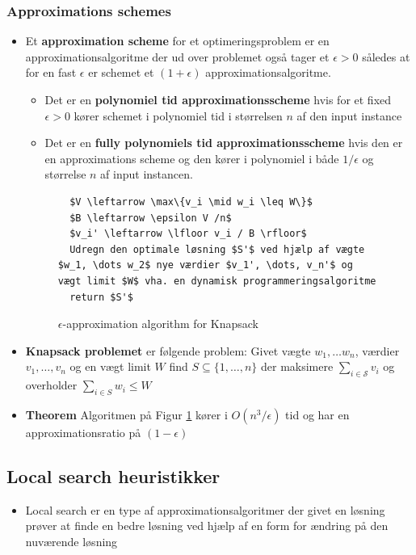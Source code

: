 \subsubsection{Approximations schemes}
\begin{itemize}
	\item Et \textbf{approximation scheme} for et optimeringsproblem er en approximationsalgoritme der ud over problemet også tager et $\epsilon >0$ således at for en fast $\epsilon$ er schemet et $(1+\epsilon)$ approximationsalgoritme. 
  \begin{itemize}
		\item Det er en \textbf{polynomiel tid approximationsscheme} hvis for et fixed $\epsilon >0$ kører schemet i polynomiel tid i størrelsen $n$ af den input instance
    \item Det er en \textbf{fully polynomiels tid approximationsscheme} hvis den er en approximations scheme og den kører i polynomiel i både $1/ \epsilon$ og størrelse $n$ af input instancen.
  \end{itemize}
  \begin{figure}[ht]
    \centering
\begin{lstlisting} 
  $V \leftarrow \max\{v_i \mid w_i \leq W\}$
  $B \leftarrow \epsilon V /n$
  $v_i' \leftarrow \lfloor v_i / B \rfloor$
  Udregn den optimale løsning $S'$ ved hjælp af vægte $w_1, \dots w_2$ nye værdier $v_1', \dots, v_n'$ og vægt limit $W$ vha. en dynamisk programmeringsalgoritme
  return $S'$ 
\end{lstlisting}
    \caption{ $\epsilon$-approximation algorithm for Knapsack\label{fig:approx-knapsack}}
  \end{figure}

  \item \textbf{Knapsack problemet} er følgende problem: Givet vægte $w_1, \dots w_n$, værdier $v_1, \dots, v_n$ og en vægt limit $W$ find $S \subseteq \{1,\dots,n\}$ der maksimere $\sum_{i \in \mathcal S} v_i$ og overholder $\sum_{i \in S} w_i \leq W$ 
  \item \textbf{Theorem} Algoritmen på Figur \ref{fig:approx-knapsack} kører i $O(n^3 / \epsilon)$ tid og har en approximationsratio på $(1- \epsilon)$
\end{itemize}


\subsection{Local search heuristikker}
\begin{itemize}
	\item Local search er en type af approximationsalgoritmer der givet en løsning prøver at finde en bedre løsning ved hjælp af en form for ændring på den nuværende løsning
\end{itemize}
